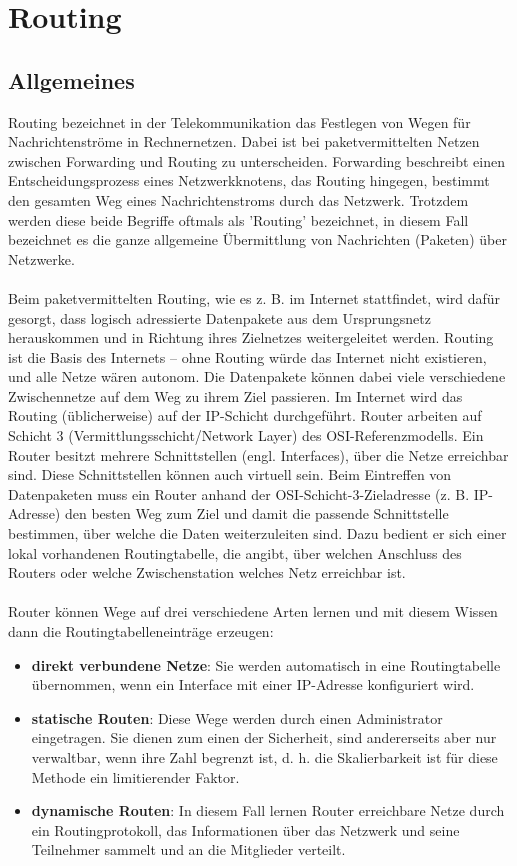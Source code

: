 \chapter{Routing}

\section{Allgemeines}

Routing bezeichnet in der Telekommunikation das Festlegen von Wegen für Nachrichtenströme in Rechnernetzen. Dabei ist bei paketvermittelten Netzen zwischen Forwarding und Routing zu unterscheiden. Forwarding beschreibt einen Entscheidungsprozess eines Netzwerkknotens, das Routing hingegen, bestimmt den gesamten Weg eines Nachrichtenstroms durch das Netzwerk. Trotzdem werden diese beide Begriffe oftmals als 'Routing' bezeichnet, in diesem Fall bezeichnet es die ganze allgemeine Übermittlung von Nachrichten (Paketen) über Netzwerke.\\\\
Beim paketvermittelten Routing, wie es z. B. im Internet stattfindet, wird dafür gesorgt, dass logisch adressierte Datenpakete aus dem Ursprungsnetz herauskommen und in Richtung ihres Zielnetzes weitergeleitet werden. Routing ist die Basis des Internets – ohne Routing würde das Internet nicht existieren, und alle Netze wären autonom. Die Datenpakete können dabei viele verschiedene Zwischennetze auf dem Weg zu ihrem Ziel passieren. Im Internet wird das Routing (üblicherweise) auf der IP-Schicht durchgeführt.
Router arbeiten auf Schicht 3 (Vermittlungsschicht/Network Layer) des OSI-Referenzmodells. Ein Router besitzt mehrere Schnittstellen (engl. Interfaces), über die Netze erreichbar sind. Diese Schnittstellen können auch virtuell sein. Beim Eintreffen von Datenpaketen muss ein Router anhand der OSI-Schicht-3-Zieladresse (z. B. IP-Adresse) den besten Weg zum Ziel und damit die passende Schnittstelle bestimmen, über welche die Daten weiterzuleiten sind. Dazu bedient er sich einer lokal vorhandenen Routingtabelle, die angibt, über welchen Anschluss des Routers oder welche Zwischenstation welches Netz erreichbar ist.\\\\
Router können Wege auf drei verschiedene Arten lernen und mit diesem Wissen dann die Routingtabelleneinträge erzeugen:

\begin{itemize}
\item \textbf{direkt verbundene Netze}: Sie werden automatisch in eine Routingtabelle übernommen, wenn ein Interface mit einer IP-Adresse konfiguriert wird.
\item \textbf{statische Routen}: Diese Wege werden durch einen Administrator eingetragen. Sie dienen zum einen der Sicherheit, sind andererseits aber nur verwaltbar, wenn ihre Zahl begrenzt ist, d. h. die Skalierbarkeit ist für diese Methode ein limitierender Faktor.
\item \textbf{dynamische Routen}: In diesem Fall lernen Router erreichbare Netze durch ein Routingprotokoll, das Informationen über das Netzwerk und seine Teilnehmer sammelt und an die Mitglieder verteilt.
\end{itemize}

